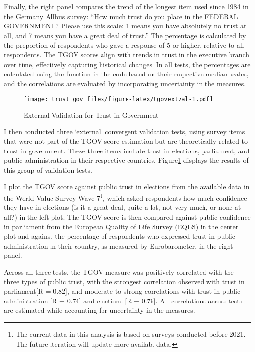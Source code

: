 \documentclass[
  12pt,
]{article}
\begin{document}
Finally, the right panel compares the trend of the longest item used since 1984 in the Germany Allbus survey: ``How much trust do you place in the FEDERAL GOVERNMENT? Please use this scale: 1 means you have absolutely no trust at all, and 7 means you have a great deal of trust.''
The percentage is calculated by the proportion of respondents who gave a response of 5 or higher, relative to all respondents.
The TGOV scores align with trends in trust in the executive branch over time, effectively capturing historical changes.
In all tests, the percentages are calculated using the function in the code based on their respective median scales, and the correlations are evaluated by incorporating uncertainty in the measures.

\begin{figure}
\centering
\texttt{[image: trust\_gov\_files/figure-latex/tgovextval-1.pdf]}
\caption{\label{fig:tgovextval}External Validation for Trust in Government \label{tgov_ev1}}
\end{figure}

I then conducted three `external' convergent validation tests, using survey items that were not part of the TGOV score estimation but are theoretically related to trust in government.
These three items include trust in elections, parliament, and public administration in their respective countries.
Figure\nobreakspace{}\ref{tgov_ev1} displays the results of this group of validation tests.

I plot the TGOV score against public trust in elections from the available data in the World Value Survey Wave 7\footnote{The current data in this analysis is based on surveys conducted before 2021. The future iteration will update more availabl data.}, which asked respondents how much confidence they have in elections (is it a great deal, quite a lot, not very much, or none at all?) in the left plot.
The TGOV score is then compared against public confidence in parliament from the European Quality of Life Survey (EQLS) in the center plot and against the percentage of respondents who expressed trust in public administration in their country, as measured by Eurobarometer, in the right panel.

Across all three tests, the TGOV measure was positively correlated with the three types of public trust, with the strongest correlation observed with trust in parliament{[}R = 0.82{]}, and moderate to strong correlations with trust in public administration {[}R = 0.74{]} and elections {[}R = 0.79{]}.
All correlations across tests are estimated while accounting for uncertainty in the measures.
\end{document}
